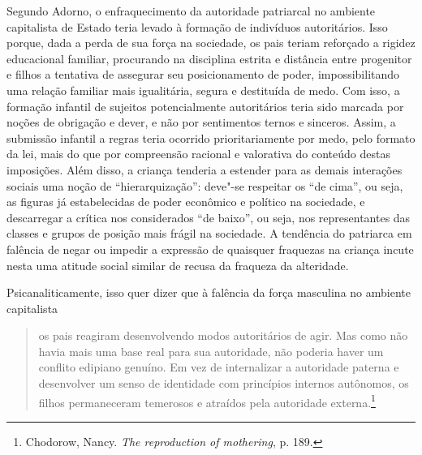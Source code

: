 Segundo Adorno, o enfraquecimento da autoridade patriarcal no ambiente
capitalista de Estado teria levado à formação de indivíduos
autoritários. Isso porque, dada a perda de sua força na sociedade, os
pais teriam reforçado a rigidez educacional familiar, procurando na
disciplina estrita e distância entre progenitor e filhos a tentativa de
assegurar seu posicionamento de poder, impossibilitando uma relação
familiar mais igualitária, segura e destituída de medo. Com isso, a
formação infantil de sujeitos potencialmente autoritários teria sido
marcada por noções de obrigação e dever, e não por sentimentos ternos e
sinceros. Assim, a submissão infantil a regras teria ocorrido
prioritariamente por medo, pelo formato da lei, mais do que por
compreensão racional e valorativa do conteúdo destas imposições. Além
disso, a criança tenderia a estender para as demais interações sociais
uma noção de ``hierarquização'': deve"-se respeitar os ``de cima'', ou
seja, as figuras já estabelecidas de poder econômico e político na
sociedade, e descarregar a crítica nos considerados ``de baixo'', ou
seja, nos representantes das classes e grupos de posição mais frágil na
sociedade. A tendência do patriarca em falência de negar ou impedir a
expressão de quaisquer fraquezas na criança incute nesta uma atitude
social similar de recusa da fraqueza da alteridade.

Psicanaliticamente, isso quer dizer que à falência da força masculina no
ambiente capitalista

\begin{quote}
os pais reagiram desenvolvendo modos autoritários de agir. Mas como não
havia mais uma base real para sua autoridade, não poderia haver um
conflito edipiano genuíno. Em vez de internalizar a autoridade paterna e
desenvolver um senso de identidade com princípios internos autônomos, os
filhos permaneceram temerosos e atraídos pela autoridade
externa.\footnote{Chodorow, Nancy.
  \emph{The reproduction of mothering}, p. 189.}
\end{quote}

